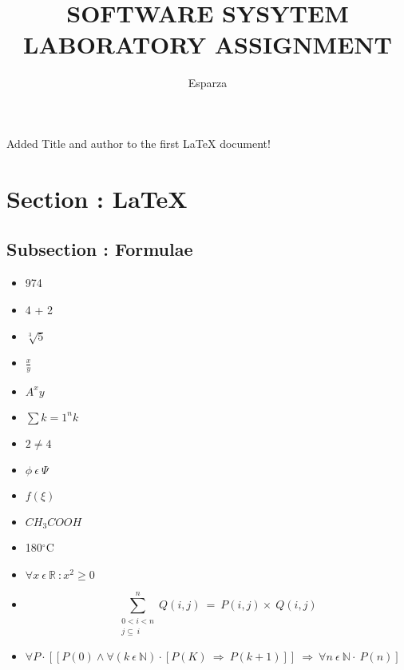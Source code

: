 \documentclass{article}
\title{SOFTWARE SYSYTEM LABORATORY ASSIGNMENT}
\author{Esparza}
\begin{document}
\maketitle
Added Title and author to the first \LaTeX{} document!
\section{Section : LaTeX}

\subsection{ Subsection : Formulae}
\begin{itemize}
\item 974
\item 4 + 2
\item $\sqrt[3]{5}$
\item $\frac{x}{y}$
\item $A^x{y}$
\item $\sum{k}=1^n{k}$
\item ${2}\neq{4}$
\item $\phi\:\epsilon\:\Psi$
\item $f(\xi)$
\item $CH_{3}COOH$
\item 180$^{\circ}$C
\item $\forall{x}\:\epsilon\:\mathbb{R}\: : x^2\geq{0}$
\item \begin{equation}
  \sum_{\substack{0<i<n\\
                  j\subseteq\:i}}^n
        Q(i,j)\:=\:P(i,j)\times\:Q(i,j)
\end{equation}
\item $\forall{P}\cdot[[P(0)\wedge\forall{(k\:\epsilon\:\mathbb{N})}\cdot[P(K)\:\Rightarrow\:P(k+1)]]\:\Rightarrow\:\forall{n}\:\epsilon\:\mathbb{N}\cdot\:P(n)]$
\end{itemize}
\end{document}
